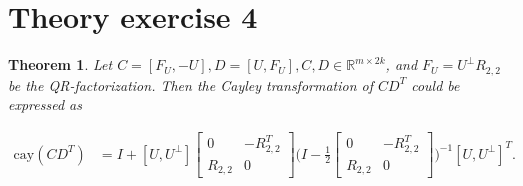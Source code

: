 \documentclass[11pt,a4paper,english]{elsarticle}%
\newtheorem{theorem}{Theorem}
\begin{document}
\section{Theory exercise 4}

\begin{theorem}
  Let $C = [F_U,-U], D = [U,F_U], C,D \in \mathbb{R}^{m \times 2k}$, and $F_U = U^{\perp}R_{2,2}$ be the QR-factorization. Then the Cayley transformation of $CD^T$ could be expressed as

  \begin{align*}
    \text{cay}(CD^T) &= I + [U,U^{\perp}]\begin{bmatrix}
      0&-R^T_{2,2}\\
      R_{2,2}&0
    \end{bmatrix}
    \biggl(I-\frac{1}{2}
    \begin{bmatrix}
      0&-R^T_{2,2}\\
      R_{2,2}&0
    \end{bmatrix}
    \biggl)^{-1}[U,U^{\perp}]^T.
  \end{align*}
\end{theorem}
\end{document}
